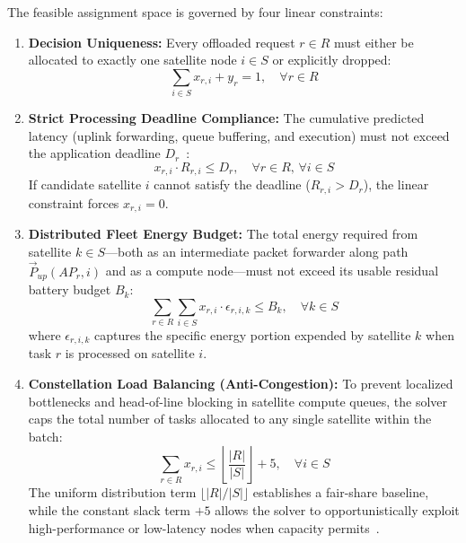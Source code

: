 The feasible assignment space is governed by four linear constraints:
\begin{enumerate}
    \item \textbf{Decision Uniqueness:} Every offloaded request $r \in R$ must either be allocated to exactly one satellite node $i \in S$ or explicitly dropped:
    \begin{equation}
        \sum_{i \in S} x_{r,i} + y_r = 1, \quad \forall r \in R
        \label{eq:constraint_uniqueness}
    \end{equation}
    \item \textbf{Strict Processing Deadline Compliance:} The cumulative predicted latency (uplink forwarding, queue buffering, and execution) must not exceed the application deadline $D_r$~\cite{icdcs_satellite_2025}:
    \begin{equation}
        x_{r,i} \cdot R_{r,i} \le D_r, \quad \forall r \in R, \, \forall i \in S
        \label{eq:constraint_deadline}
    \end{equation}
    If candidate satellite $i$ cannot satisfy the deadline ($R_{r,i} > D_r$), the linear constraint forces $x_{r,i} = 0$.
    \item \textbf{Distributed Fleet Energy Budget:} The total energy required from satellite $k \in S$—both as an intermediate packet forwarder along path $\vec{P}_{up}(AP_r, i)$ and as a compute node—must not exceed its usable residual battery budget $B_k$:
    \begin{equation}
        \sum_{r \in R} \sum_{i \in S} x_{r,i} \cdot \epsilon_{r,i,k} \le B_k, \quad \forall k \in S
        \label{eq:constraint_energy}
    \end{equation}
    where $\epsilon_{r,i,k}$ captures the specific energy portion expended by satellite $k$ when task $r$ is processed on satellite $i$.
    \item \textbf{Constellation Load Balancing (Anti-Congestion):} To prevent localized bottlenecks and head-of-line blocking in satellite compute queues, the solver caps the total number of tasks allocated to any single satellite within the batch:
    \begin{equation}
        \sum_{r \in R} x_{r,i} \le \left\lfloor \frac{|R|}{|S|} \right\rfloor + 5, \quad \forall i \in S
        \label{eq:constraint_load_balancing}
    \end{equation}
    The uniform distribution term $\lfloor |R| / |S| \rfloor$ establishes a fair-share baseline, while the constant slack term $+5$ allows the solver to opportunistically exploit high-performance or low-latency nodes when capacity permits~\cite{tang2003loadbalancing}.
\end{enumerate}

